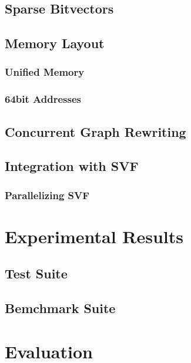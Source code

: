\subsection{Sparse Bitvectors}
\subsection{Memory Layout}
\subsubsection{Unified Memory}
\subsubsection{64bit Addresses}
\subsection{Concurrent Graph Rewriting}
\subsection{Integration with SVF}
\subsubsection{Parallelizing SVF}
\section{Experimental Results}
\subsection{Test Suite}
\subsection{Bemchmark Suite}
\section{Evaluation}
